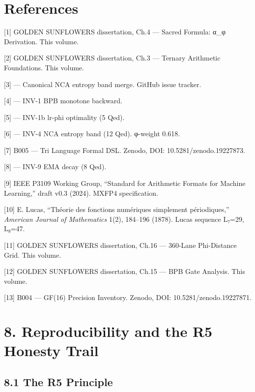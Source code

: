 \section{References}\label{fa_10:references}

[1] GOLDEN SUNFLOWERS dissertation, Ch.4 ---
Sacred Formula: α\_φ Derivation. This volume.

[2] GOLDEN SUNFLOWERS dissertation, Ch.3 ---
Ternary Arithmetic Foundations. This volume.

[3]  --- Canonical
NCA entropy band merge. GitHub issue tracker.

[4]
--- INV-1 BPB monotone backward.

[5]
--- INV-1b lr-phi optimality (5 Qed).

[6]
--- INV-4 NCA entropy band (12 Qed). φ-weight
0.618.

[7] B005 --- Tri Language Formal DSL. Zenodo,
DOI: 10.5281/zenodo.19227873.

[8]
--- INV-9 EMA decay (8 Qed).

[9] IEEE P3109 Working Group, ``Standard for
Arithmetic Formats for Machine Learning,'' draft
v0.3 (2024). MXFP4 specification.

[10] E. Lucas, ``Théorie des fonctions
numériques simplement périodiques,''
\emph{American Journal of Mathematics} 1(2),
184--196 (1878). Lucas sequence L₇=29, L₈=47.

[11] GOLDEN SUNFLOWERS dissertation, Ch.16 ---
360-Lane Phi-Distance Grid. This volume.

[12] GOLDEN SUNFLOWERS dissertation, Ch.15 ---
BPB Gate Analysis. This volume.

[13] B004 --- GF(16) Precision Inventory.
Zenodo, DOI: 10.5281/zenodo.19227871.

\section{8. Reproducibility and the R5 Honesty
Trail}\label{fa_10:reproducibility-r5-honesty}

\subsection{8.1 The R5
Principle}\label{fa_10:the-r5-principle}

